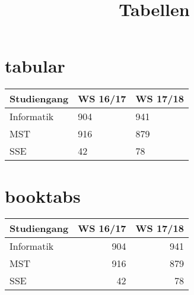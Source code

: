 \documentclass[a4paper]{scrartcl}
\title{Tabellen}
\author{}
\date{}
\begin{document}
\maketitle

\section*{tabular}
\begin{center}
\begin{tabular}{l|ll}
Studiengang & WS 16/17 & WS 17/18  \\ \hline %
Informatik & 904 & 941\\
MST & 916 & 879\\
SSE & 42 & 78
\end{tabular}
\end{center}

\section*{booktabs}
\begin{center}
\begin{tabular}{@{}lrr@{}}
\toprule
Studiengang & WS 16/17 & WS 17/18  \\
\midrule
Informatik & 904 & 941\\
MST & 916 & 879\\
SSE & 42 & 78\\
\bottomrule
\end{tabular}
\end{center}
\end{document}
